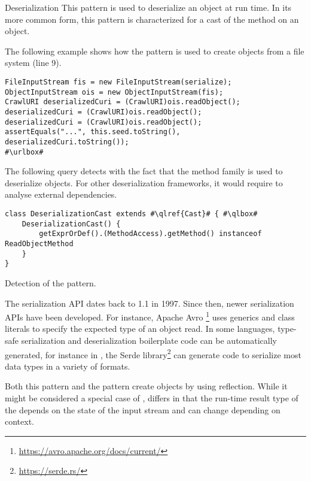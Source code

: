 \begin{pattern}{Deserialization}
This pattern is used to deserialize an object at run time.
In its more common form,
this pattern is characterized for a cast of the  method on an  object.

\instances{}
The following example shows how the \thisp{} pattern is used to create objects from a file system (line 9).

\def\urlvar{http://bit.ly/internetarchive_heritrix3_2SF4j7k}
\begin{verbatim}
FileInputStream fis = new FileInputStream(serialize);
ObjectInputStream ois = new ObjectInputStream(fis);
CrawlURI deserializedCuri = (CrawlURI)ois.readObject();
deserializedCuri = (CrawlURI)ois.readObject();
deserializedCuri = (CrawlURI)ois.readObject();
assertEquals("...", this.seed.toString(), deserializedCuri.toString());
#\urlbox#
\end{verbatim}


\detection{}
The following query detects \thisp{} with the fact that the  method family is used to deserialize objects.
For other deserialization frameworks,
it would require to analyse external dependencies.

\begin{listing}
\begin{verbatim}
class DeserializationCast extends #\qlref{Cast}# { #\qlbox#
	DeserializationCast() {
		getExprOrDef().(MethodAccess).getMethod() instanceof ReadObjectMethod
	}
}
\end{verbatim}
\caption{Detection of the \thisp{} pattern.}
\label{lst:ql:DeserializationCast}
\end{listing}


\issues{}
The serialization API dates back to \java{} 1.1 in 1997.
Since then, newer serialization APIs have been developed.
For instance, Apache Avro%
\footnote{\url{https://avro.apache.org/docs/current/}}
uses generics and class literals to specify the expected type of an object read. 
In some languages,
type-safe serialization and deserialization boilerplate code can be automatically generated,
for instance in \rust{},
the Serde library\footnote{\url{https://serde.rs/}}
can generate code to serialize most data types
in a variety of formats.

Both this pattern and the  pattern create objects by using reflection.
While it might be considered a special case of , 
\thisp{} differs in that the run-time result type of the  depends on the state of the input stream and can change depending on context.
 
\end{pattern}